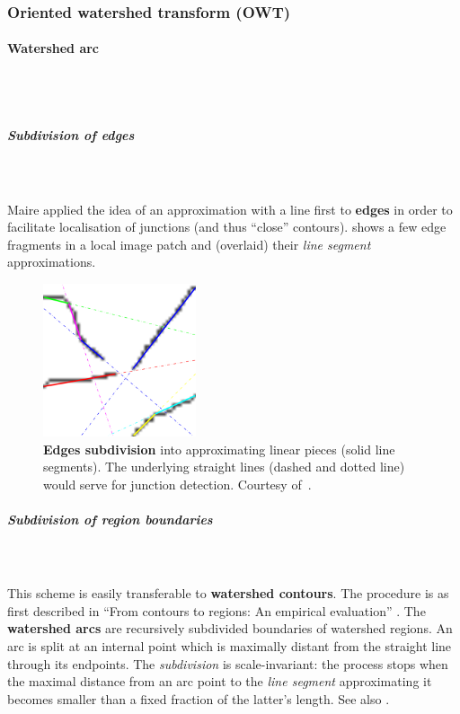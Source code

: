 \subsubsection{Oriented watershed transform (OWT)}
\label{sec:ch3-OWT}
\paragraph{Watershed arc}\mbox{}\\\mbox{}\\
\label{par:ch3-watershed-arc}
\subparagraph{Subdivision of edges}\mbox{}\\\mbox{}\\
Maire \etal \cite{Maire2008using} applied the idea of an approximation %
with a line first to {\bf edges} in order to facilitate localisation of junctions (and thus ``close'' contours).  shows a few edge fragments in a local image patch and (overlaid) their {\it line segment} approximations.

\begin{figure}[ht!]
 \centering
 \includegraphics[width=0.4\textwidth,frame]{images/gPb-OWT-UCM/Maire2008using-contour-subdivision.png}
 \caption[Edges subdivision - an image patch]{{\bf Edges subdivision} into approximating linear pieces (solid line segments). The underlying straight lines (dashed and dotted line) would serve for junction detection. Courtesy of~\cite{Maire2008using}.}
 \label{fig:Maire08using-contour-subdivision}
\end{figure}

\subparagraph{Subdivision of region boundaries}\mbox{}\\\mbox{}\\
This scheme is easily transferable to {\bf watershed contours}. The procedure is as first described in ``From contours to regions: An empirical evaluation'' \cite{Arbelaez09}. The {\bf watershed arcs} are recursively subdivided boundaries of watershed regions. An arc is split at an internal point which is maximally distant from the straight line through %
its endpoints. The {\it subdivision} is scale-invariant: the process stops when the maximal distance from an arc point to the {\it line segment} approximating it becomes smaller than a fixed fraction of the latter's %
length. See also .

